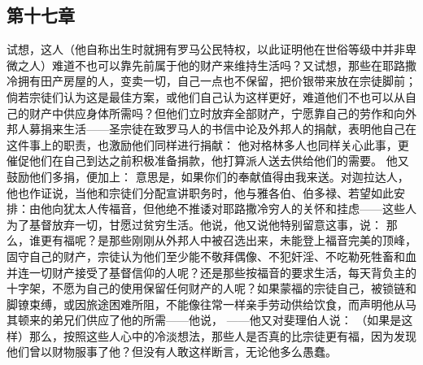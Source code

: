 
\subsection{第十七章}

\par

试想，这人（他自称出生时就拥有罗马公民特权，以此证明他在世俗等级中并非卑微之人）难道不也可以靠先前属于他的财产来维持生活吗？又试想，那些在耶路撒冷拥有田产房屋的人，变卖一切，自己一点也不保留，把价银带来放在宗徒脚前；倘若宗徒们认为这是最佳方案，或他们自己认为这样更好，难道他们不也可以从自己的财产中供应身体所需吗？但他们立时放弃全部财产，宁愿靠自己的劳作和向外邦人募捐来生活——圣宗徒在致罗马人的书信中论及外邦人的捐献，表明他自己在这件事上的职责，也激励他们同样进行捐献：  他对格林多人也同样关心此事，更催促他们在自己到达之前积极准备捐款，他打算派人送去供给他们的需要。 他又鼓励他们多捐，便加上：  意思是，如果你们的奉献值得由我来送。对迦拉达人，他也作证说，当他和宗徒们分配宣讲职务时，他与雅各伯、伯多禄、若望如此安排：由他向犹太人传福音，但他绝不推诿对耶路撒冷穷人的关怀和挂虑——这些人为了基督放弃一切，甘愿过贫穷生活。他说，他又说他特别留意这事，说：  那么，谁更有福呢？是那些刚刚从外邦人中被召选出来，未能登上福音完美的顶峰，固守自己的财产，宗徒认为他们至少能不敬拜偶像、不犯奸淫、不吃勒死牲畜和血并连一切财产接受了基督信仰的人呢？还是那些按福音的要求生活，每天背负主的十字架，不愿为自己的使用保留任何财产的人呢？如果蒙福的宗徒自己，被锁链和脚镣束缚，或因旅途困难所阻，不能像往常一样亲手劳动供给饮食，而声明他从马其顿来的弟兄们供应了他的所需——他说，  ——他又对斐理伯人说：  （如果是这样）那么，按照这些人心中的冷淡想法，那些人是否真的比宗徒更有福，因为发现他们曾以财物服事了他？但没有人敢这样断言，无论他多么愚蠢。\par

